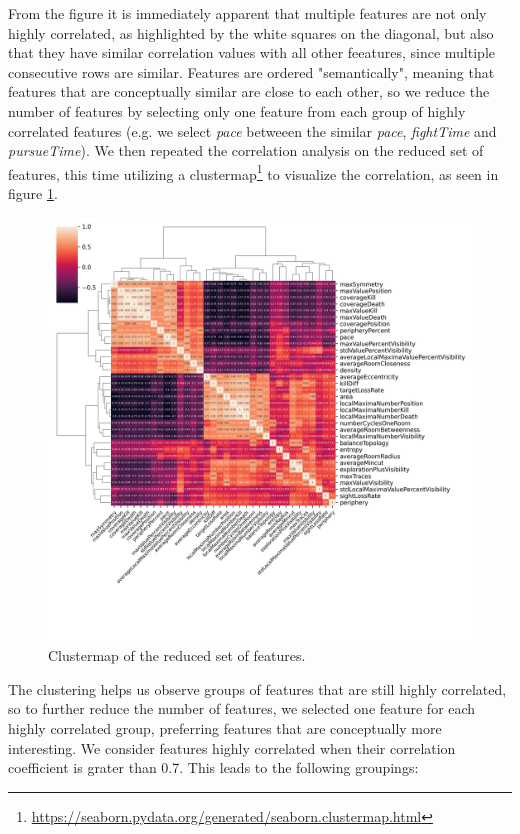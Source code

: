 \documentclass{Configuration_Files/PoliMi3i_thesis}
\begin{document}
From the figure it is immediately apparent that multiple features are not only highly correlated, as highlighted by the white squares on the diagonal, but also that they have similar correlation values with all other feeatures, since multiple consecutive rows are similar. Features are ordered "semantically", meaning that features that are conceptually similar are close to each other, so we reduce the number of features by selecting only one feature from each group of highly correlated features (e.g. we select \textit{pace} betweeen the similar \textit{pace}, \textit{fightTime} and \textit{pursueTime}). We then repeated the correlation analysis on the reduced set of features, this time utilizing a clustermap\footnote{\url{https://seaborn.pydata.org/generated/seaborn.clustermap.html}} to visualize the correlation, as seen in figure \ref{fig:correlation_clustermap_reduced}.

\begin{figure}[hbt!]
    \centering
    \includegraphics[width=1.0\textwidth]{images/covariance_clustermap_reduced.png}
    \caption{Clustermap of the reduced set of features.}
    \label{fig:correlation_clustermap_reduced}
\end{figure}

The clustering helps us observe groups of features that are still highly correlated, so to further reduce the number of features, we selected one feature for each highly correlated group, preferring features that are conceptually more interesting. We consider features highly correlated when their correlation coefficient is grater than 0.7. This leads to the following groupings:
\end{document}
